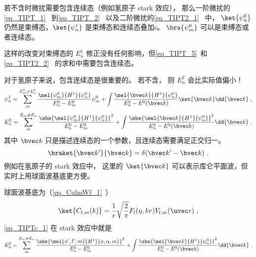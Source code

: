 
\begin{issues}
\issueDraft
\end{issues}


若不含时微扰需要包含连续态（例如氢原子 stark 效应）， 那么一阶微扰的\autoref{eq_TIPT_1}~ 到\autoref{eq_TIPT_2}~ 以及二阶微扰的\autoref{eq_TIPT2_1}~ 中， $\ket{\psi_n^0}$ 仍然是束缚态，$\ket{\psi_n^1}$ 是束缚态和连续态叠加s。 $\bra{\psi_m^0}$ 可以是束缚态或者连续态。

这样的改变对束缚态的 $E_n^1$ 修正没有任何影响，但\autoref{eq_TIPT_5}~和\autoref{eq_TIPT2_2}~ 的求和中需要包含连续态。

对于氢原子来说，包含连续态是很重要的。 若不含， 则 $E_n^2$ 会比实际值偏小！
\begin{equation}
\psi_n^1 = \sum_m^{E_m^0 \ne E_n^0} \frac{\mel{\psi_m^0}{H^1}{\psi_n^0}}{E_n^0 - E_m^0} \psi_m^0
+ \int \frac{\mel{\bvec k}{H^1}{\psi_n^0}}{E_n^0 - E^0(\bvec k)} \ket{\bvec k}\dd{\bvec k}~,
\end{equation}
%
\begin{equation}\label{eq_TIPTc_1}
E_n^2 = \sum_{m}^{E_m\ne E_n} \frac{\abs{\mel{\psi_m^0}{H^1}{\psi_n^0}}^2}{E_n^0-E_m^0}
+ \int \frac{\abs{\mel{\bvec k}{H^1}{\psi_n^0}}^2}{E_n^0-E^0(\bvec k)}\dd{\bvec k}~.
\end{equation}
其中 $\bvec k$ 只是描述连续态的一个参数，且连续态需要满足正交归一。
\begin{equation}
\braket{\bvec k'}{\bvec k} = \delta(\bvec k'-\bvec k)~.
\end{equation}
例如在氢原子的 stark 效应中， 这里的 $\ket{\bvec k}$ 可以表示库仑平面波，但实时上用球面波基底更方便。

球面波基底为（\autoref{eq_CulmWf_1}~）
\begin{equation}
\ket{C_{l,m}(k)} = \frac{1}{r} \sqrt{\frac{2}{\pi}} F_l(\eta, kr) Y_{l,m}(\uvec r)~,
\end{equation}
\autoref{eq_TIPTc_1} 在 stark 效应中就是
\begin{equation}
E_n^2 = \sum_{m}^{E_m\ne E_n} \frac{\abs{\mel{n',l',m}{H^1}{n,\alpha,m}}^2}{E_n^0-E_m^0}
+ \int \frac{\abs{\mel{\bvec k}{H^1}{\psi_n^0}}^2}{E_n^0-E^0(\bvec k)}\dd{\bvec k}~.
\end{equation}
